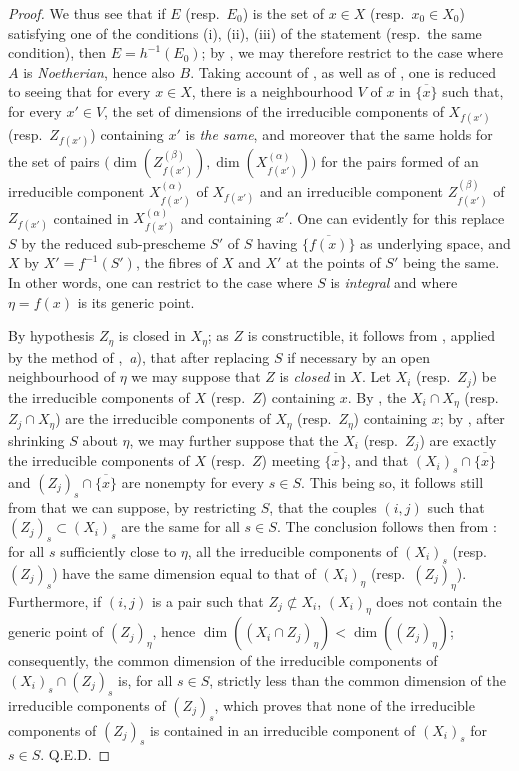 \begin{proof}
We thus see that if $E$ (resp.~$E_0$) is the set of $x\in X$ (resp.~$x_0\in X_0$) satisfying one of the conditions (i), (ii), (iii) of the statement (resp.~the same condition), then $E=h^{-1}(E_0)$; by , we may therefore restrict to the case where $A$ is \emph{Noetherian}, hence also $B$.
Taking account of , as well as of , one is reduced to seeing that for every $x\in X$, there is a neighbourhood $V$ of $x$ in $\overline{\{x\}}$ such that, for every $x'\in V$, the set of dimensions of the irreducible components of $X_{f(x')}$ (resp.\ $Z_{f(x')}$) containing $x'$ is \emph{the same}, and moreover that the same holds for the set of pairs $\bigl(\dim(Z_{f(x')}^{(\beta)}),\dim(X_{f(x')}^{(\alpha)})\bigr)$
for the pairs formed of an irreducible component $X_{f(x')}^{(\alpha)}$ of $X_{f(x')}$ and an irreducible component $Z_{f(x')}^{(\beta)}$ of $Z_{f(x')}$ contained in $X_{f(x')}^{(\alpha)}$ and containing $x'$.
One can evidently for this replace $S$ by the reduced sub-prescheme $S'$ of $S$ having $\overline{\{f(x)\}}$ as underlying space, and $X$ by $X'=f^{-1}(S')$, the fibres of $X$ and $X'$ at the points of $S'$ being the same.
In other words, one can restrict to the case where $S$ is \emph{integral} and where $\eta=f(x)$ is its generic point.

By hypothesis $Z_\eta$ is closed in $X_\eta$; as $Z$ is constructible, it follows from , applied by the method of ,~\emph{a}), that after replacing $S$ if necessary by an open neighbourhood of $\eta$ we may suppose that $Z$ is \emph{closed} in $X$.
Let $X_i$ (resp.~$Z_j$) be the irreducible components of $X$ (resp.~$Z$) containing $x$.
By , the $X_i\cap X_\eta$ (resp.~$Z_j\cap X_\eta$) are the irreducible components of $X_\eta$ (resp.~$Z_\eta$) containing $x$; by , after shrinking $S$ about $\eta$, we may further suppose that the $X_i$ (resp.~$Z_j$) are exactly the irreducible components of $X$ (resp.~$Z$) meeting $\overline{\{x\}}$, and that $(X_i)_s\cap\overline{\{x\}}$ and $(Z_j)_s\cap\overline{\{x\}}$ are nonempty for every $s\in S$.
This being so, it follows still from  that we can suppose, by restricting $S$, that the couples $(i,j)$ such that $(Z_j)_s\subset(X_i)_s$ are the same for all $s\in S$.
The conclusion follows then from : for all $s$ sufficiently close to $\eta$, all the irreducible components of $(X_i)_s$ (resp.~$(Z_j)_s$) have the same dimension equal to that of $(X_i)_\eta$ (resp.~$(Z_j)_\eta$).
Furthermore, if $(i,j)$ is a pair such that $Z_j\not\subset X_i$, $(X_i)_\eta$ does not contain the
generic point of $(Z_j)_\eta$, hence $\dim((X_i\cap Z_j)_\eta)<\dim((Z_j)_\eta)$; consequently, the common dimension of the irreducible components of $(X_i)_s\cap(Z_j)_s$ is, for all $s\in S$, strictly less than the common dimension of the irreducible components of $(Z_j)_s$, which proves that none of the irreducible components of $(Z_j)_s$ is contained in an irreducible component of $(X_i)_s$ for $s\in S$. Q.E.D.
\end{proof}

